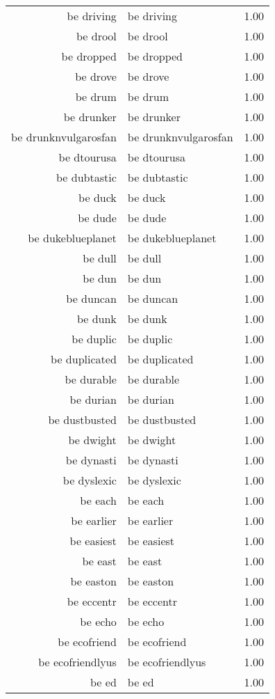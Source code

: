 \begin{table}[ht]
\begin{tabular}{rlr}
  be driving & be driving & 1.00 \\ 
  be drool & be drool & 1.00 \\ 
  be dropped & be dropped & 1.00 \\ 
  be drove & be drove & 1.00 \\ 
  be drum & be drum & 1.00 \\ 
  be drunker & be drunker & 1.00 \\ 
  be drunknvulgarosfan & be drunknvulgarosfan & 1.00 \\ 
  be dtourusa & be dtourusa & 1.00 \\ 
  be dubtastic & be dubtastic & 1.00 \\ 
  be duck & be duck & 1.00 \\ 
  be dude & be dude & 1.00 \\ 
  be dukeblueplanet & be dukeblueplanet & 1.00 \\ 
  be dull & be dull & 1.00 \\ 
  be dun & be dun & 1.00 \\ 
  be duncan & be duncan & 1.00 \\ 
  be dunk & be dunk & 1.00 \\ 
  be duplic & be duplic & 1.00 \\ 
  be duplicated & be duplicated & 1.00 \\ 
  be durable & be durable & 1.00 \\ 
  be durian & be durian & 1.00 \\ 
  be dustbusted & be dustbusted & 1.00 \\ 
  be dwight & be dwight & 1.00 \\ 
  be dynasti & be dynasti & 1.00 \\ 
  be dyslexic & be dyslexic & 1.00 \\ 
  be each & be each & 1.00 \\ 
  be earlier & be earlier & 1.00 \\ 
  be easiest & be easiest & 1.00 \\ 
  be east & be east & 1.00 \\ 
  be easton & be easton & 1.00 \\ 
  be eccentr & be eccentr & 1.00 \\ 
  be echo & be echo & 1.00 \\ 
  be ecofriend & be ecofriend & 1.00 \\ 
  be ecofriendlyus & be ecofriendlyus & 1.00 \\ 
  be ed & be ed & 1.00 \\ 

\end{tabular}
\end{table}
